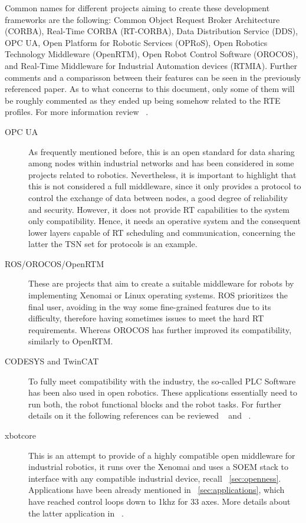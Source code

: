 Common names for different projects aiming to create these development frameworks are the following: Common Object Request Broker Architecture
(CORBA), Real-Time CORBA (RT-CORBA), Data Distribution Service (DDS), OPC UA, Open Platform for Robotic Services (OPRoS), 
Open Robotics Technology Middleware (OpenRTM), Open Robot Control Software (OROCOS), 
and Real-Time Middleware for Industrial Automation devices (RTMIA). Further comments and a comparisson between their features
can be seen in the previously referenced paper. As to what concerns to this document, only some of them will be roughly commented
as they ended up being somehow related to the RTE profiles. For more information review ~\cite{middleware_xbotcore}.

\begin{description}
    \item[OPC UA] As frequently mentioned before, this is an open standard for data sharing among nodes within industrial networks and has
    been considered in some projects related to robotics. Nevertheless, it is important to highlight that this is not considered a full 
    middleware, since it only provides a protocol to control the exchange of data between nodes, a good degree of reliability and security.
    However, it does not provide RT capabilities to the system only compatibility. Hence, it needs an operative system and the consequent 
    lower layers capable of RT scheduling and communication, concerning the latter the TSN set for protocols is an example.
    \item[ROS/OROCOS/OpenRTM] These are projects that aim to create a suitable middleware for robots by implementing Xenomai or Linux operating systems. 
    ROS prioritizes the final user, avoiding in the way some fine-grained features due to its difficulty, therefore having sometimes
    issues to meet the hard RT requirements. Whereas OROCOS has further improved its compatibility, similarly to OpenRTM.
    \item[CODESYS and TwinCAT] To fully meet compatibility with the industry, the so-called PLC Software has been also used in open robotics.
    These applications essentially need to run both, the robot functional blocks and the robot tasks. For further details on it the following
    references can be reviewed ~\cite{middleware_xbotcore} and ~\cite{middleware_xbotcloud}. %
    \item[xbotcore] This is an attempt to provide of a highly compatible open middleware for industrial robotics, it runs over the Xenomai and 
    uses a SOEM stack to interface with any compatible industrial device, recall ~\ref{sec:openness}. %
    Applications have been already mentioned in ~\ref{sec:applications}, which have reached control loops down to 1khz for 33 axes. More details about the 
    latter application in ~\cite{middleware_xbotcore}.
\end{description}


